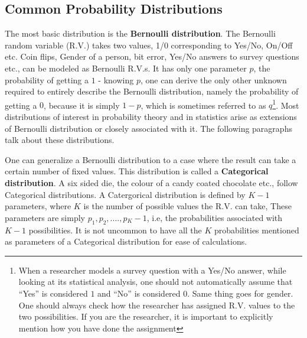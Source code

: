 \subsection {Common Probability Distributions}
The most basic distribution is the \textbf{Bernoulli distribution}. The Bernoulli random variable (R.V.) takes two values, 1/0 corresponding to Yes/No, On/Off etc. Coin flips, Gender of a person, bit error, Yes/No answers to survey questions etc., can be modeled as Bernoulli R.V.s. It has only one parameter $p$, the probability of getting a $1$ - knowing $p$, one can derive the only other unknown required to entirely describe the Bernoulli distribution, namely the probability of getting a $0$, because it is simply $1-p$, which is sometimes referred to as $q$\footnote{When a researcher models a survey question with a Yes/No answer, while looking at its statistical analysis, one should not automatically assume that ``Yes'' is considered $1$ and ``No'' is considered $0$. Same thing goes for gender. One should always check how the researcher has assigned R.V. values to the two possibilities. If you are the researcher, it is important to explicitly mention how you have done the assignment}. Most distributions of interest in probability theory and in statistics arise as extensions of Bernoulli distribution or closely associated with it. The following paragraphs talk about these distributions.

One can generalize a Bernoulli distribution to a case where the result can take a certain number of fixed values. This distribution is called a \textbf{Categorical distribution}. A six sided die, the colour of a candy coated chocolate etc., follow Categorical distributions. A Catergorical distribution is defined by $K-1$ parameters, where $K$ is the number of possible values the R.V. can take, These parameters are simply $p_1, p_2, .... , p{_K-1}$, i.e, the probabilities associated with $K-1$ possibilities. It is not uncommon to have all the $K$ probabilities mentioned as parameters of a Categorical distribution for ease of calculations.

